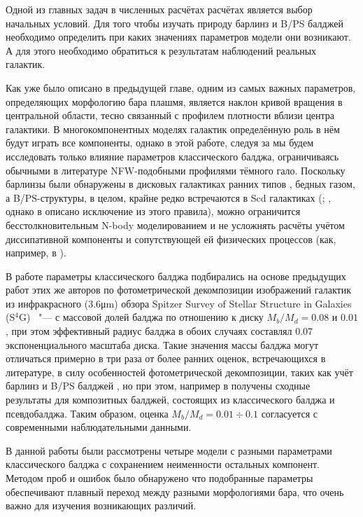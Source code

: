 \documentclass{trlnotes}
\begin{document}
Одной из главных задач в численных расчётах расчётах является выбор начальных условий. Для того чтобы изучать
природу барлинз и B/PS балджей необходимо определить при каких значениях параметров модели они возникают. А для
этого необходимо обратиться к результатам наблюдений реальных галактик.

Как уже было описано в предыдущей главе, одним из самых важных параметров, определяющих морфологию бара плашмя,
является наклон кривой вращения в центральной области, тесно связанный с профилем плотности вблизи центра
галактики. В многокомпонентных моделях галактик определённую роль в нём будут играть все компоненты, однако в этой
работе, следуя за \citet{salo2017} мы будем исследовать только влияние параметров классического балджа, 
ограничиваясь обычными в литературе NFW-подобными профилями тёмного гало. Поскольку барлинзы были обнаружены в 
дисковых галактиках ранних типов \citep{laurikainen2011}, бедных газом, а B/PS-структуры, в целом, крайне редко 
встречаются в Scd галактиках (\cite{erwin2017}; \cite{li2017a}, однако в \cite{lutticke2000} описано исключение из 
этого правила), можно ограничится бесстолкновительным N-body моделированием и не усложнять расчёты учётом 
диссипативной компоненты и сопутствующей ей физических процессов (как, например, в \cite{athanassoula2015}). 

В работе \citet{salo2017} параметры классического балджа подбирались на основе предыдущих работ этих же авторов по 
фотометрической декомпозиции изображений галактик из инфракрасного (3.6\thinspace μm) обзора  Spitzer Survey of 
Stellar Structure in Galaxies (S${}^4$G) \citep{salo2015}~"--- с массовой долей балджа по отношению к диску 
$M_b/M_d = 0.08$ и $0.01$, при этом эффективный радиус балджа в обоих случаях составлял $0.07$ экспоненциального 
масштаба диска. Такие значения массы балджа могут отличаться примерно в три раза от более ранних оценок, 
встречающихся в литературе, в силу особенностей фотометрической декомпозиции, таких как учёт барлинз и B/PS 
балджей \citep{laurikainen2016a}, но при этом, например в \citet{erwin2015} получены сходные результаты для 
композитных балджей, состоящих из классического балджа и псевдобалджа. Таким образом, оценка $M_b/M_d = 0.01 \div 
0.1$ согласуется с современными наблюдательными данными.

В данной работы были рассмотрены четыре модели с разными параметрами классического балджа с сохранением 
неименности остальных компонент. Методом проб и ошибок было обнаружено что подобранные параметры обеспечивают 
плавный переход между разными морфологиями бара, что очень важно для изучения возникающих различий. 
\end{document}
